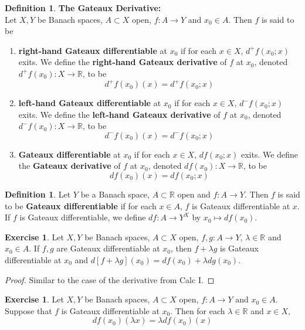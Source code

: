 \documentclass[12pt]{amsart}
\theoremstyle{definition}
\newtheorem{defn}[definition]{Definition}
\newtheorem{ex}[definition]{Exercise}
\newcommand{\lam}{\lambda}
\newcommand{\R}{\mathbb{R}}
\newcommand{\lex}[1]{\label{ex:#1}}
\newcommand{\ld}[1]{\label{defn:#1}}
\begin{document}
	\begin{defn} \ld{}\textbf{The Gateaux Derivative:}\\
	Let $X,Y$ be Banach spaces, $A \subset X$ open, $f:A \rightarrow Y$ and $x_0 \in A$. Then $f$ is said to be 
	\begin{enumerate}
	\item \textbf{right-hand Gateaux differentiable} at $x_0$ if for each $x \in X$, $d^+ f(x_0; x)$ exits. We define the \textbf{right-hand Gateaux derivative} of $f$ at $x_0$, denoted $d^+ f(x_0) : X \rightarrow \R$, to be $$d^+ f(x_0)(x) = d^+ f(x_0;x)$$ 
	
	\item \textbf{left-hand Gateaux differentiable} at $x_0$ if for each $x \in X$, $d^- f(x_0; x)$ exits. We define the \textbf{left-hand Gateaux derivative} of $f$ at $x_0$, denoted $d^- f(x_0) : X \rightarrow \R$, to be $$d^- f(x_0)(x) = d^- f(x_0;x)$$
	
	\item \textbf{Gateaux differentiable} at $x_0$ if for each $x \in X$, $d f(x_0; x)$ exits. We define the \textbf{Gateaux derivative} of $f$ at $x_0$, denoted $d f(x_0) : X \rightarrow \R$, to be $$d f(x_0)(x) = d f(x_0;x)$$
	\end{enumerate}
	\end{defn}
	
	\begin{defn} \ld{61003}
Let $Y$ be a Banach space, $A \subset \R$ open and $f:A \rightarrow Y$. Then $f$ is said to be \textbf{Gateaux differentiable} if for each $x \in A$, $f$ is Gateaux differentiable at $x$. If $f$ is Gateaux differentiable, we define $df:A \rightarrow Y^X$ by $x_0 \mapsto df(x_0)$.
\end{defn}	
	
	\begin{ex} \lex{61004}
	Let $X, Y$ be Banach spaces, $A \subset X$ open, $f,g :A \rightarrow Y$, $\lam \in \R$ and $x_0 \in A$. If $f, g$ are Gateaux differentiable at $x_0$, then $f + \lam g$ is Gateaux differentiable at $x_0$ and $d[f+\lam g](x_0) = df(x_0) + \lam dg(x_0)$.
	\end{ex}
	
	\begin{proof}
	Similar to the case of the derivative from Calc I. 
	\end{proof}		
	
	\begin{ex} \lex{61005}
	Let $X, Y$ be Banach spaces, $A \subset X$ open, $f:A \rightarrow Y$ and $x_0 \in A$. Suppose that $f$ is Gateaux differentiable at $x_0$. Then for each $\lam \in \R$ and $x \in X$, $$df(x_0)(\lam x) = \lam df(x_0)(x)$$
	\end{ex}
	
\end{document}
